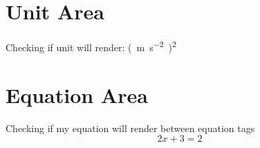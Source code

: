 \documentclass{article}
\newcommand\myUnit{\si{(\meter\per\second^2)^2}}
\newcommand\myeq{2x + 3 = 2}
\begin{document}
\section{Unit Area}
Checking if unit will render: \myUnit
\section{Equation Area}
Checking if my equation will render between equation tags
\begin{equation}
    \myeq
\end{equation}
\end{document}
